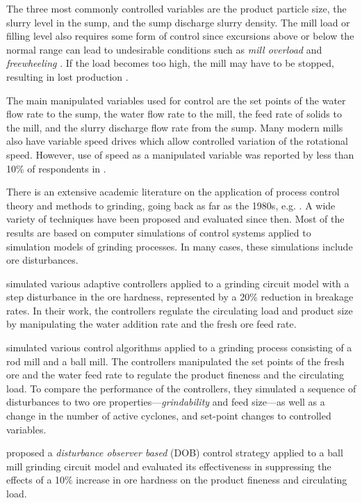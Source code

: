 The three most commonly controlled variables are the product particle size, the slurry level in the sump, and the sump discharge slurry density. The mill load or filling level also requires some form of control since excursions above or below the normal range can lead to undesirable conditions such as \textit{mill overload} and \textit{freewheeling} \citep{mcclure_overload_2015}. If the load becomes too high, the mill may have to be stopped, resulting in lost production \citep{wei_grinding_2009}.

The main manipulated variables used for control are the set points of the water flow rate to the sump, the water flow rate to the mill, the feed rate of solids to the mill, and the slurry discharge flow rate from the sump. Many modern mills also have variable speed drives which allow controlled variation of the rotational speed. However, use of speed as a manipulated variable was reported by less than 10\% of respondents in \cite{wei_grinding_2009}.

There is an extensive academic literature on the application of process control theory and methods to grinding, going back as far as the 1980s, e.g. \cite{herbst_optimal_1988}. A wide variety of techniques have been proposed and evaluated since then. Most of the results are based on computer simulations of control systems applied to simulation models of grinding processes. In many cases, these simulations include ore disturbances.

\cite{najim_adaptive_1995} simulated various adaptive controllers applied to a grinding circuit model with a step disturbance in the ore hardness, represented by a 20\% reduction in breakage rates. In their work, the controllers regulate the circulating load and product size by manipulating the water addition rate and the fresh ore feed rate.

\cite{pomerleau_survey_2000} simulated various control algorithms applied to a grinding process consisting of a rod mill and a ball mill. The controllers manipulated the set points of the fresh ore and the water feed rate to regulate the product fineness and the circulating load. To compare the performance of the controllers, they simulated a sequence of disturbances to two ore properties---\textit{grindability} and feed size---as well as a change in the number of active cyclones, and set-point changes to controlled variables.

\cite{chen_disturbance_2009} proposed a \textit{disturbance observer based} (\gls{DOB}) control strategy applied to a ball mill grinding circuit model and evaluated its effectiveness in suppressing the effects of a 10\% increase in ore hardness on the product fineness and circulating load.

